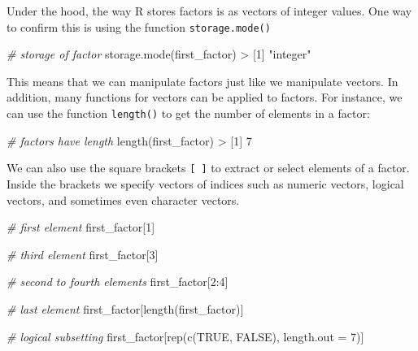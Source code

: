 \documentclass[
]{book}
\newenvironment{Shaded}{\begin{snugshade}}{\end{snugshade}}
\newcommand{\AttributeTok}[1]{\textcolor[rgb]{0.77,0.63,0.00}{#1}}
\newcommand{\CommentTok}[1]{\textcolor[rgb]{0.56,0.35,0.01}{\textit{#1}}}
\newcommand{\ConstantTok}[1]{\textcolor[rgb]{0.00,0.00,0.00}{#1}}
\newcommand{\DecValTok}[1]{\textcolor[rgb]{0.00,0.00,0.81}{#1}}
\newcommand{\FunctionTok}[1]{\textcolor[rgb]{0.00,0.00,0.00}{#1}}
\newcommand{\NormalTok}[1]{#1}
\newcommand{\SpecialCharTok}[1]{\textcolor[rgb]{0.00,0.00,0.00}{#1}}
\newcommand{\StringTok}[1]{\textcolor[rgb]{0.31,0.60,0.02}{#1}}
\begin{document}
Under the hood, the way R stores factors is as vectors of integer values.
One way to confirm this is using the function \texttt{storage.mode()}

\begin{Shaded}
\begin{Highlighting}[]
\CommentTok{\# storage of factor}
\FunctionTok{storage.mode}\NormalTok{(first\_factor)}
\SpecialCharTok{\textgreater{}}\NormalTok{ [}\DecValTok{1}\NormalTok{] }\StringTok{"integer"}
\end{Highlighting}
\end{Shaded}

This means that we can manipulate factors just like we manipulate vectors. In
addition, many functions for vectors can be applied to factors. For instance,
we can use the function \texttt{length()} to get the number of elements in a factor:

\begin{Shaded}
\begin{Highlighting}[]
\CommentTok{\# factors have length}
\FunctionTok{length}\NormalTok{(first\_factor)}
\SpecialCharTok{\textgreater{}}\NormalTok{ [}\DecValTok{1}\NormalTok{] }\DecValTok{7}
\end{Highlighting}
\end{Shaded}

We can also use the square brackets \texttt{{[}\ {]}} to extract or select elements of a
factor. Inside the brackets we specify vectors of indices such as numeric
vectors, logical vectors, and sometimes even character vectors.

\begin{Shaded}
\begin{Highlighting}[]
\CommentTok{\# first element}
\NormalTok{first\_factor[}\DecValTok{1}\NormalTok{]}

\CommentTok{\# third element}
\NormalTok{first\_factor[}\DecValTok{3}\NormalTok{]}

\CommentTok{\# second to fourth elements}
\NormalTok{first\_factor[}\DecValTok{2}\SpecialCharTok{:}\DecValTok{4}\NormalTok{]}

\CommentTok{\# last element}
\NormalTok{first\_factor[}\FunctionTok{length}\NormalTok{(first\_factor)]}

\CommentTok{\# logical subsetting}
\NormalTok{first\_factor[}\FunctionTok{rep}\NormalTok{(}\FunctionTok{c}\NormalTok{(}\ConstantTok{TRUE}\NormalTok{, }\ConstantTok{FALSE}\NormalTok{), }\AttributeTok{length.out =} \DecValTok{7}\NormalTok{)]}
\end{Highlighting}
\end{Shaded}
\end{document}
